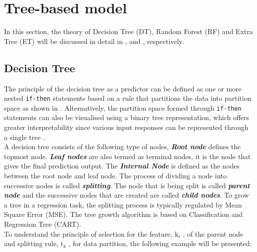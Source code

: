 \section{Tree-based model}\label{sec:tree_intro}

In this section, the theory of Decision Tree (DT), Random Forest (RF) and Extra Tree (ET) will be discussed in detail in ,  and , respectively.\\  

\subsection{Decision Tree}\label{sec:dt_theo}

The principle of the decision tree as a predictor can be defined as one or more nested {\tt if-then} statements based on a rule that partitions the data into partition space as shown in . Alternatively, the partition space formed through {\tt if-then} statements can also be visualised using a binary tree representation, which offers greater interpretability since various input responses can be represented through a single tree .\\

A decision tree consists of the following type of nodes, \textbf{\emph{Root node}} defines the topmost node. \textbf{\emph{Leaf nodes}} are also termed as terminal nodes, it is the node that gives the final prediction output. The \textbf{\emph{Internal Node}} is defined as the nodes between the root node and leaf node. The process of dividing a node into successive nodes is called \textbf{\emph{splitting}}. The node that is being split is called \textbf{\emph{parent node}} and the successive nodes that are created are called \textbf{\emph{child nodes}}. To grow a tree in a regression task, the splitting process is typically regulated by Mean Square Error (MSE). The tree growth algorithm is based on Classification and Regression Tree (CART).\\

To understand the principle of selection for the feature, $\text{k}_t$ , of the parent node and splitting rule, $\text{t}_k$ , for data partition, the following example will be presented:\\

